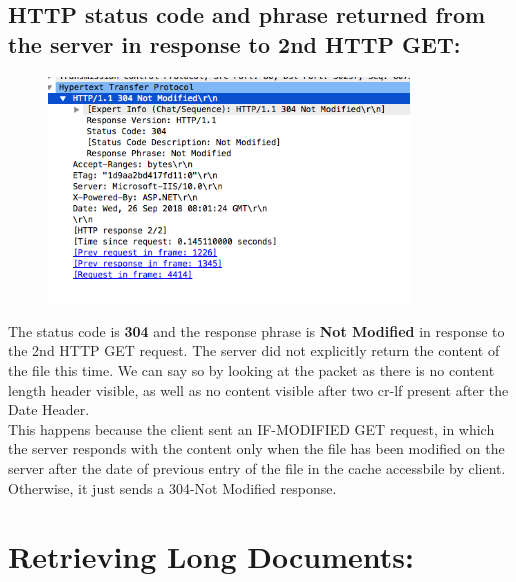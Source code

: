 \documentclass[]{report}
\begin{document}
\subsection{HTTP status code and phrase returned from the server in response to 2nd HTTP GET:}
\begin{figure}[H]
	\vspace{0pt}
	\includegraphics[height = 170pt, keepaspectratio]{Snapshots/q2/2_4.png}
\end{figure}
The status code is \textbf{304} and the response phrase is \textbf{Not Modified} in response to the 2nd HTTP GET request. The server did not explicitly return the content of the file this time. We can say so by looking at the packet as there is no content length header visible, as well as no content visible after two cr-lf present after the Date Header. \\
This happens because the client sent an IF-MODIFIED GET request, in which the server responds with the content only when the file has been modified on the server after the date of previous entry of the file in the cache accessbile by client. Otherwise, it just sends a 304-Not Modified response. 


\section{Retrieving Long Documents:}
\end{document}
